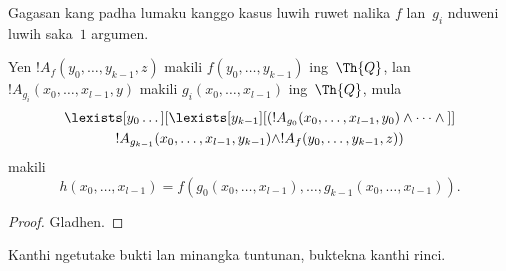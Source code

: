 \documentclass[../../../include/open-logic-section]{subfiles}
\begin{document}
Gagasan kang padha lumaku kanggo kasus luwih ruwet nalika $f$ lan~$g_i$
nduweni luwih saka~$1$ argumen.

\begin{prop}
Yen $!A_f(y_0, \dots, y_{k-1}, z)$ makili $f(y_0, \dots, y_{k-1})$
ing~$\Th{Q}$, lan $!A_{g_i}(x_0, \dots, x_{l-1}, y)$ makili
$g_i(x_0, \dots, x_{l-1})$ ing~$\Th{Q}$, mula
\begin{multline*}
  \lexists[y_0\dots][\lexists[y_{k-1}][(!A_{g_0}(x_0,\dots,x_{l-1},y_0) \land
      \dots \land {}]]\\
  !A_{g_{k-1}}(x_0,\dots,x_{l-1},y_{k-1}) \land !A_f(y_0,\dots,y_{k-1},z))
\end{multline*}
makili
\[
h(x_0, \dots, x_{l-1}) = f(g_0(x_0, \dots, x_{l-1}), \dots, g_{k-1}(x_0,
\dots, x_{l-1})).
\]
\end{prop}

\begin{proof}
Gladhen.
\end{proof}

\begin{prob}
Kanthi ngetutake bukti  lan
 minangka tuntunan, buktekna
 kanthi rinci.
\end{prob}
\end{document}
